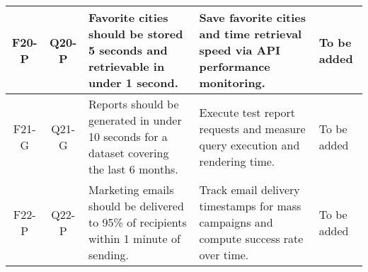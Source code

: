\begin{longtable}{|c|c|p{4.5cm}|p{3.5cm}|p{3.5cm}|}
    \hline
    F20-P & Q20-P & Favorite cities should be stored 5 seconds and retrievable in under 1 second. & Save favorite cities and time retrieval speed via API performance monitoring. & To be added \\
    \hline
    F21-G & Q21-G & Reports should be generated in under 10 seconds for a dataset covering the last 6 months. & Execute test report requests and measure query execution and rendering time. & To be added \\
    \hline
    F22-P & Q22-P & Marketing emails should be delivered to 95\% of recipients within 1 minute of sending. & Track email delivery timestamps for mass campaigns and compute success rate over time. & To be added \\
    \hline

\end{longtable}




